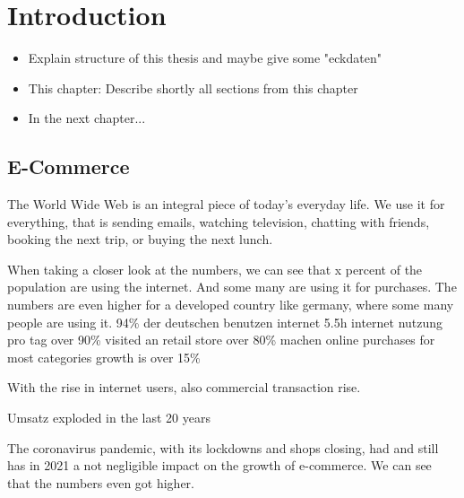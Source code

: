 \chapter{Introduction}

\begin{itemize}
	\item Explain structure of this thesis and maybe give some "eckdaten"
	\item This chapter: Describe shortly all sections from this chapter
	\item In the next chapter...
\end{itemize}




\section{E-Commerce}



The World Wide Web is an integral piece of today's everyday life.
We use it for everything, that is sending emails, watching television, chatting with friends, booking the next trip, or buying the next lunch.


When taking a closer look at the numbers, we can see that x percent of the population are using the internet.
And some many are using it for purchases.
The numbers are even higher for a developed country like germany, where some many people are using it.
94\% der deutschen benutzen internet
5.5h internet nutzung pro tag
over 90\% visited an retail store
over 80\% machen online purchases
for most categories growth is over 15\%

With the rise in internet users, also commercial transaction rise.

Umsatz exploded in the last 20 years


The coronavirus pandemic, with its lockdowns and shops closing, had and still has in 2021 a not negligible impact on the growth of e-commerce.
We can see that the numbers even got higher.


